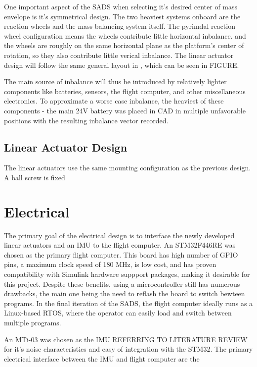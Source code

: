 One important aspect of the SADS when selecting it's desired center of mass envelope is it's symmetrical design. The two heaviest systems onboard are the reaction wheels and the mass balancing system itself. The pyrimdal reaction wheel configuration means the wheels contribute little horizontal inbalance. and the wheels are roughly on the same horizontal plane as the platform's center of rotation, so they also contribute little verical inbalance. The linear actuator design will follow the same general layout in \cite{gilman_automatic_2024}, which can be seen in FIGURE. 

The main source of inbalance will thus be introduced by relatively lighter components like batteries, sensors, the flight computer, and other miscellaneous electronics. To approximate a worse case inbalance, the heaviest of these components - the main 24V battery was placed in CAD in multiple unfavorable positions with the resulting inbalance vector recorded. 


\subsection{Linear Actuator Design}

The linear actuators use the same mounting configuration as the previous design. A ball screw is fixed 


\section{Electrical}

The primary goal of the electrical design is to interface the newly developed linear actuators and an IMU to the flight computer. An STM32F446RE was chosen as the primary flight computer. This board has high number of GPIO pins, a maximum clock speed of 180 MHz, is low cost, and has proven compatibility with Simulink hardware suppport packages, making it desirable for this project. Despite these benefits, using a microcontroller still has numerous drawbacks, the main one being the need to reflash the board to switch bewteen programs. In the final iteration of the SADS, the flight computer ideally runs as a Linux-based RTOS, where the operator can easily load and switch between multiple programs. 

An MTi-03 was chosen as the IMU REFERRING TO LITERATURE REVIEW for it's noise characteristics and easy of integration with the STM32. The primary electrical interface between the IMU and flight computer are the  



